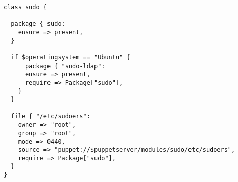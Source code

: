 \begin{lstlisting}
class sudo {

  package { sudo:
    ensure => present,
  }
  
  if $operatingsystem == "Ubuntu" {
      package { "sudo-ldap":
      ensure => present,
      require => Package["sudo"],
    }
  }
  
  file { "/etc/sudoers":
    owner => "root",
    group => "root",
    mode => 0440,
    source => "puppet://$puppetserver/modules/sudo/etc/sudoers",
    require => Package["sudo"],
  }
}
\end{lstlisting}

